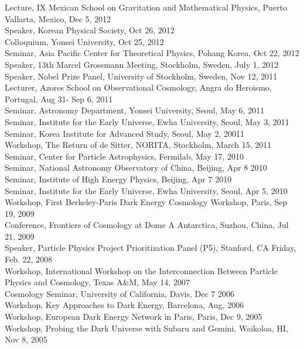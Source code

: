 \documentclass[line, margin]{res}
\begin{document}
\begin{resume}
Lecture, IX Mexican School on Gravitation and Mathematical Physics, Puerto Vallarta, Mexico, Dec 5, 2012\\
Speaker, Korean Physical Society, Oct 26, 2012\\
Colloquium, Yonsei University, Oct 25, 2012\\
Seminar, Asia Pacific Center for Theoretical Physics, Pohang Korea, Oct 22, 2012\\
Speaker, 13th Marcel Grossmann Meeting, Stockholm, Sweden, July 1, 2012\\ 
Speaker, Nobel Prize Panel, University of Stockholm, Sweden, Nov 12, 2011\\
Lecturer, Azores School on Observational Cosmology, Angra do Heroismo, Portugal, Aug 31- Sep 6, 2011\\
Seminar, Astronomy Department, Yonsei University, Seoul, May 6, 2011\\
Seminar, Institute for the Early Universe, Ewha University, Seoul, May 3, 2011\\
Seminar, Korea Institute for Advanced Study, Seoul, May 2, 20011\\
Workshop, The Return of de Sitter, NORITA, Stockholm, March 15, 2011\\
Seminar, Center for Particle Astrophysics, Fermilab, May 17, 2010\\
Seminar, National Astronomy Observatory of China, Beijing, Apr 8 2010\\
Seminar, Institute of High Energy Physics, Beijing, Apr 7 2010\\
Seminar, Institute for the Early Universe, Ewha University, Seoul, Apr 5, 2010\\
Workshop, First Berkeley-Paris Dark Energy Cosmology Workshop, Paris, Sep 19, 2009\\
Conference, Frontiers of Cosmology at Dome A Antarctica, Suzhou, China, Jul 21, 2009\\
Speaker, Particle Physics Project Prioritization Panel (P5), Stanford, CA Friday, Feb. 22, 2008\\
Workshop, International Workshop on the Interconnection Between
Particle Physics and Cosmology, Texas A\&M, May 14, 2007 \\
Cosmology Seminar, University of California, Davis, Dec 7 2006\\
Workshop, Key Approaches to Dark Energy, Barcelona,  Aug, 2006\\
Workshop, European Dark Energy Network in Paris, Paris, Dec 9, 2005 \\
Workshop, Probing the Dark Universe with Subaru and Gemini, Waikoloa, HI, Nov 8, 2005\\

\end{resume}
\end{document}
